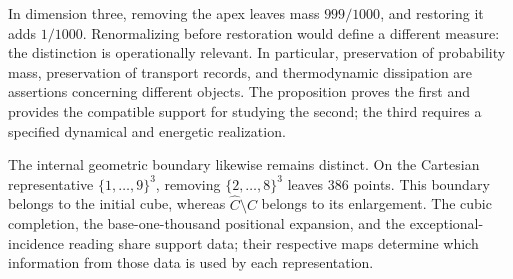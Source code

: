 In dimension three, removing the apex leaves mass \(999/1000\), and
restoring it adds \(1/1000\). Renormalizing before restoration
would define a different measure: the distinction is operationally relevant.
In particular, preservation of probability mass, preservation of
transport records, and thermodynamic dissipation are assertions concerning
different objects. The proposition proves the first and provides the
compatible support for studying the second; the third requires a
specified dynamical and energetic realization.

The internal geometric boundary likewise remains distinct.
On the Cartesian representative \(\{1,\ldots,9\}^3\), removing
\(\{2,\ldots,8\}^3\) leaves \(386\) points. This boundary belongs to the
initial cube, whereas \(\widehat C\setminus C\) belongs to its
enlargement. The cubic completion, the base-one-thousand positional expansion,
and the exceptional-incidence reading share support data;
their respective maps determine which information from those data is used by
each representation.
